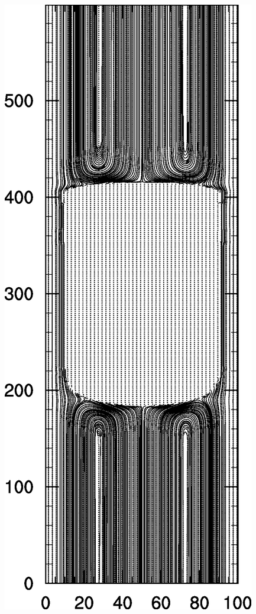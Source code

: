 \documentclass{article}
\begin{document}
\begin{description}
\begin{figure}[htb!]
\includegraphics[angle=90,width=\textwidth]{Figures/performed_ca0097.eps}\\

\end{figure}
\end{description}
\end{document}
